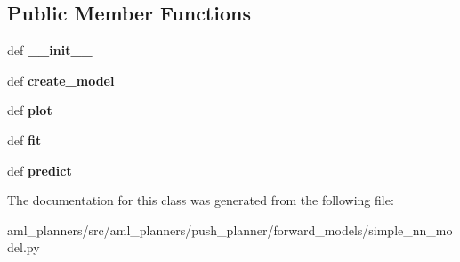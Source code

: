 \subsection*{Public Member Functions}
\begin{DoxyCompactItemize}
\item 
\hypertarget{classaml__planners_1_1push__planner_1_1forward__models_1_1simple__nn__model_1_1_simple_n_n_model_a9eae0ebd47d99163b09e3fdd32c7924f}{def {\bfseries \-\_\-\-\_\-init\-\_\-\-\_\-}}\label{classaml__planners_1_1push__planner_1_1forward__models_1_1simple__nn__model_1_1_simple_n_n_model_a9eae0ebd47d99163b09e3fdd32c7924f}

\item 
\hypertarget{classaml__planners_1_1push__planner_1_1forward__models_1_1simple__nn__model_1_1_simple_n_n_model_ab16755a701afa0c5959bbd2df2fbd403}{def {\bfseries create\-\_\-model}}\label{classaml__planners_1_1push__planner_1_1forward__models_1_1simple__nn__model_1_1_simple_n_n_model_ab16755a701afa0c5959bbd2df2fbd403}

\item 
\hypertarget{classaml__planners_1_1push__planner_1_1forward__models_1_1simple__nn__model_1_1_simple_n_n_model_ac0bd9b5051b2a55d79feb33bfac28386}{def {\bfseries plot}}\label{classaml__planners_1_1push__planner_1_1forward__models_1_1simple__nn__model_1_1_simple_n_n_model_ac0bd9b5051b2a55d79feb33bfac28386}

\item 
\hypertarget{classaml__planners_1_1push__planner_1_1forward__models_1_1simple__nn__model_1_1_simple_n_n_model_a4ac639f62edef49a15dd22edfd6219c5}{def {\bfseries fit}}\label{classaml__planners_1_1push__planner_1_1forward__models_1_1simple__nn__model_1_1_simple_n_n_model_a4ac639f62edef49a15dd22edfd6219c5}

\item 
\hypertarget{classaml__planners_1_1push__planner_1_1forward__models_1_1simple__nn__model_1_1_simple_n_n_model_a4398872c54d703719ced66e0c6c0bfe4}{def {\bfseries predict}}\label{classaml__planners_1_1push__planner_1_1forward__models_1_1simple__nn__model_1_1_simple_n_n_model_a4398872c54d703719ced66e0c6c0bfe4}

\end{DoxyCompactItemize}


The documentation for this class was generated from the following file\-:\begin{DoxyCompactItemize}
\item 
aml\-\_\-planners/src/aml\-\_\-planners/push\-\_\-planner/forward\-\_\-models/simple\-\_\-nn\-\_\-model.\-py\end{DoxyCompactItemize}
